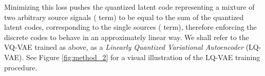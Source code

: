 \documentclass[a4paper]{article}
\begin{document}
Minimizing this loss pushes the quantized latent code representing a mixture of two arbitrary source signals ( term) to be equal to the sum of the quantized latent codes, corresponding to the single sources ( term), therefore enforcing the discrete codes to behave in an approximately linear way.
We shall refer to the VQ-VAE trained as above, as a {\em Linearly Quantized Variational Autoencoder} (LQ-VAE). See Figure \ref{fig:method_2} for a visual illustration of the LQ-VAE training procedure.
\begin{table}[t!]
\centering
\setlength{\tabcolsep}{3pt}
\end{table}
\end{document}
